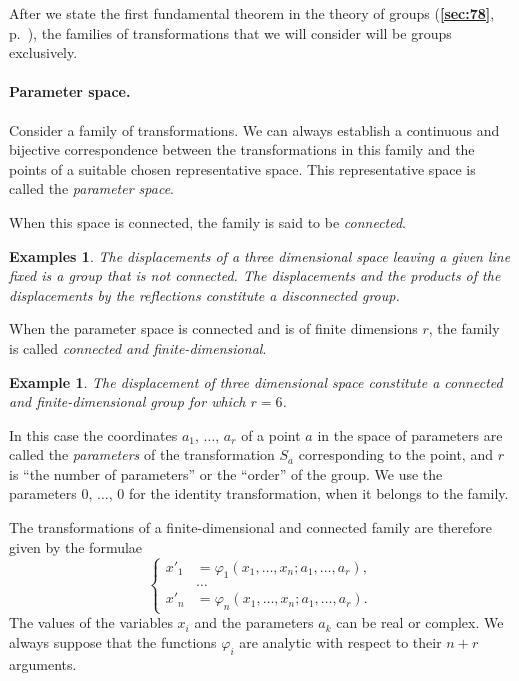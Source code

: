 \documentclass[leqno,11pt]{book}
\makeatletter
\numberwithin{equation}{chapter}
\theoremstyle{shape1}
\theoremstyle{shapesmall}
\newtheorem*{ex}{Example}
\newtheorem*{exs}{Examples}
\let\old@phi\phi
\let\old@varphi\varphi
\let\phi\old@varphi
\let\varphi\old@phi
\newcommand{\fsref}[1]{{\rm\textsection\textbf{\ref{sec:#1}}}}
\makeatother
\begin{document}
After we state the first fundamental theorem in the theory of groups (\fsref{78}, p.~\pageref{sec:78}), the families of transformations that we will consider will be groups exclusively.

\paragraph{Parameter space.}
\label{sec:60}
Consider a family of transformations. We can always establish a continuous and bijective correspondence between the transformations in this family and the points of a suitable chosen representative space. This representative space is called the \emph{parameter space}.

When this space is connected, the family is said to be \emph{connected}.

\begin{exs}
  The displacements of a three dimensional space leaving a given line fixed is a group that is not connected. The displacements and the products of the displacements by the reflections constitute a disconnected group.
\end{exs}

When the parameter space is connected and is of finite dimensions $r$, the family is called \emph{connected and finite-dimensional}.

\begin{ex}
  The displacement of three dimensional space constitute a connected and finite-dimensional group for which $r=6$.
\end{ex}

In this case the coordinates $a_{1}$, $\dots$, $a_{r}$ of a point $a$ in the space of parameters are called the \emph{parameters} of the transformation $S_{a}$ corresponding to the point, and $r$ is ``the number of parameters'' or the ``order'' of the group. We use the parameters $0$, $\dots$, $0$ for the identity transformation, when it belongs to the family.

The transformations of a finite-dimensional and connected family are therefore given by the formulae
\begin{equation}
  \label{eq:5.1}
  \left\{
    \begin{aligned}
      x'_{1}&=\phi_{1}(x_{1},\dots,x_{n};a_{1},\dots,a_{r}),\\
      &\dots\\
      x'_{n}&=\phi_{n}(x_{1},\dots,x_{n};a_{1},\dots,a_{r}).
    \end{aligned}
  \right.
\end{equation}
The values of the variables $x_{i}$ and the parameters $a_{k}$ can be real or complex. We always suppose that the functions $\phi_{i}$ are analytic with respect to their $n+r$ arguments.
\end{document}

